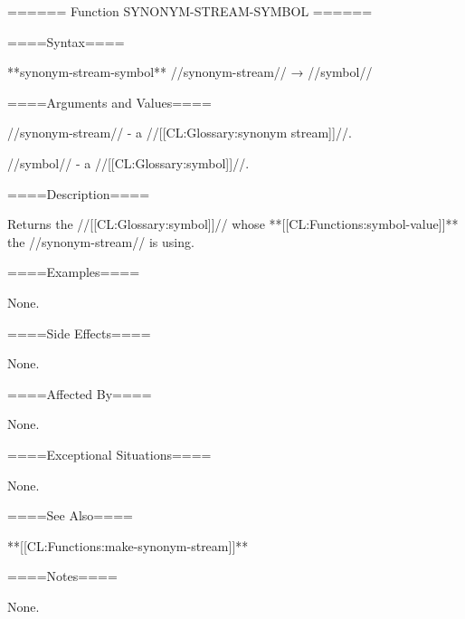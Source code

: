 ====== Function SYNONYM-STREAM-SYMBOL ======

====Syntax====

**synonym-stream-symbol** //synonym-stream// → //symbol//

====Arguments and Values====

//synonym-stream// - a //[[CL:Glossary:synonym stream]]//.

//symbol// - a //[[CL:Glossary:symbol]]//.

====Description====

Returns the //[[CL:Glossary:symbol]]// whose **[[CL:Functions:symbol-value]]** the //synonym-stream// is using.

====Examples====

None.

====Side Effects====

None.

====Affected By====

None.

====Exceptional Situations====

None.

====See Also====

**[[CL:Functions:make-synonym-stream]]**

====Notes====

None.


